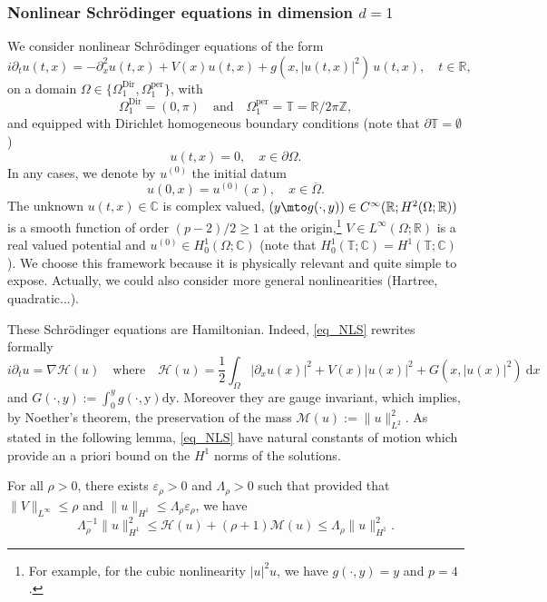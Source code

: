 \subsubsection{Nonlinear Schrödinger equations in dimension $d=1$}
\label{sub_sec_NLS}
We consider nonlinear Schrödinger equations of the form
\begin{equation}
\label{eq_NLS}
\tag{NLS}
i\partial_t u(t,x) = -\partial_x^2 u(t,x) +V(x) u(t,x) + g(x,|u(t,x)|^2)\, u(t,x), \quad t\in \mathbb{R},
\end{equation}
on a domain $\Omega \in \{ \Omega^{\mathrm{Dir}}_1, \Omega^{\mathrm{per}}_1 \}$, with
\[
\Omega^{\mathrm{Dir}}_1= (0,\pi) \quad \text{and} \quad \Omega^{\mathrm{per}}_1= \mathbb{T} = \mathbb{R}/2\pi\mathbb{Z},
\]
and equipped with Dirichlet homogeneous boundary conditions (note that $\partial \mathbb{T} = \emptyset$)
\begin{equation}
	u(t,x)= 0, \quad x\in \partial \Omega.
\end{equation}
In any cases, we denote by $u^{(0)}$ the initial datum
\[
u(0,x) = u^{(0)}(x), \quad x\in \overline{\Omega}.
\]
The unknown $u(t,x) \in \mathbb{C}$ is complex valued, $(y \mto g(\cdot,y)) \in C^\infty(\mathbb{R}; H^{2}(\Omega;\mathbb{R}))$ is a smooth function of order $(p-2)/2 \geq 1$ at the origin,\footnote{For example, for the cubic nonlinearity $|u|^2 u$, we have $g(\cdot,y)=y$ and $p=4$.} $V\in L^\infty(\Omega;\mathbb{R})$ is a real valued potential and $u^{(0)} \in H^1_0(\Omega;\mathbb{C})$ (note that $H^1_0(\mathbb{T};\mathbb{C}) = H^1(\mathbb{T};\mathbb{C})$). We choose this framework because it is physically relevant and quite simple to expose. Actually, we could also consider more general nonlinearities (\eg Hartree, quadratic...).

These Schrödinger equations are Hamiltonian. Indeed, \eqref{eq_NLS} rewrites formally
\[
i\partial_t u = \nabla \mathcal{H}(u) \quad \text{where} \quad \mathcal{H}(u) = \frac12 \int_{\Omega} |\partial_x u(x) |^2 + V(x) |u(x)|^2 + G(x,|u(x)|^2) \ \mathrm{d}x
\]
and $G(\cdot,y):= \int_0^y g(\cdot,\mathrm{y}) \mathrm{d}\mathrm{y}$. Moreover they are gauge invariant, which implies, by Noether's theorem, the preservation of the mass $
\mathcal{M}(u):= \| u \|_{L^2}^2$. As stated in the following lemma, \eqref{eq_NLS} have natural constants of motion which provide an a priori bound on the $H^1$ norms of the solutions.

\begin{lemma} \label{lemma_Lag_NLS_coer} For all $\rho>0$, there exists $\varepsilon_\rho >0$ and $\Lambda_\rho>0$ such that provided that $\| V \|_{L^\infty} \leq \rho$ and $\|u\|_{H^1} \leq \Lambda_\rho \varepsilon_\rho$, we have
\[
\Lambda_{\rho}^{-1} \| u\|_{H^1}^2 \leq \mathcal{H}(u) + (\rho+1) \mathcal{M}(u) \leq \Lambda_{\rho} \| u\|_{H^1}^2.
\]
\end{lemma}

